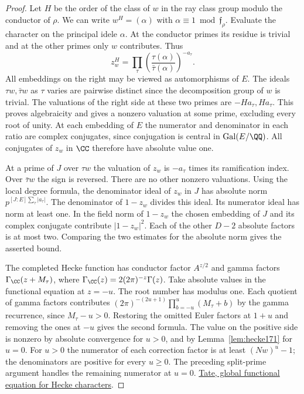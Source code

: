 \documentclass[a4paper,11pt]{article}
\theoremstyle{definition}
\theoremstyle{remark}
\numberwithin{equation}{section}
\begin{document}
\begin{proof}
Let \(H\) be the order of the class of \(w\) in the ray class
group modulo the conductor of \(\rho\). We can write
\(w^H=(\alpha)\) with \(\alpha\equiv1\bmod\mathfrak f_\rho\).
Evaluate the character on the principal idele \(\alpha\).
At the conductor primes its residue is trivial and at the
other primes only \(w\) contributes. Thus
\[
 z_w^H=\prod_\tau
      \left(\frac{\tau(\alpha)}{\bar\tau(\alpha)}\right)^{-a_\tau}.
\]
All embeddings on the right may be viewed as automorphisms of
\(E\). The ideals \(\tau w,\bar\tau w\) as \(\tau\) varies are
pairwise distinct since the decomposition group of \(w\) is
trivial. The valuations of the right side at these two primes
are \(-Ha_\tau,Ha_\tau\). This proves algebraicity and gives
a nonzero valuation at some prime, excluding every root of
unity. At each embedding of \(E\) the numerator and denominator
in each ratio are complex conjugates, since conjugation is
central in \(\operatorname{Gal}(E/\QQ)\). All conjugates of
\(z_w\) in \(\CC\) therefore have absolute value one.

At a prime of \(J\) over \(\tau w\) the valuation of \(z_w\) is
\(-a_\tau\) times its ramification index. Over \(\bar\tau w\)
the sign is reversed. There are no other nonzero valuations.
Using the local degree formula, the denominator ideal of
\(z_w\) in \(J\) has absolute norm
\(p^{[J:E]\sum_\tau|a_\tau|}\). The denominator of \(1-z_w\)
divides this ideal. Its numerator ideal has norm at least one.
In the field norm of \(1-z_w\) the chosen embedding of \(J\)
and its complex conjugate contribute \(|1-z_w|^2\). Each of
the other \(D-2\) absolute factors is at most two. Comparing
the two estimates for the absolute norm gives the asserted bound.

The completed Hecke function has conductor factor \(A^{z/2}\)
and gamma factors \(\Gamma_{\CC}(z+M_\tau)\), where
\(\Gamma_{\CC}(z)=2(2\pi)^{-z}\Gamma(z)\). Take absolute values
in the functional equation at \(z=-u\). The root number has
modulus one. Each quotient of gamma factors contributes
\((2\pi)^{-(2u+1)}\prod_{b=-u}^u(M_\tau+b)\) by the gamma
recurrence, since \(M_\tau-u>0\). Restoring the omitted Euler
factors at \(1+u\) and removing the ones at \(-u\) gives the
second formula. The value on the positive side is nonzero by
absolute convergence for \(u>0\), and by Lemma~\ref{lem:hecke171}
for \(u=0\). For \(u>0\) the numerator of each correction
factor is at least \((Nw)^u-1\); the denominators are positive
for every \(u\ge0\). The preceding split-prime argument handles
the remaining numerator at \(u=0\).
\href{https://sites.math.rutgers.edu/~alexk/2023S572/Tate1950.pdf}
{Tate, global functional equation for Hecke characters}.
\end{proof}
\end{document}
